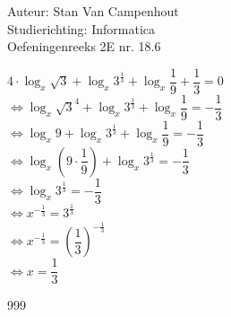 \documentclass[a4paper]{article}
\begin{document}
  
\noindent \large Auteur: Stan Van Campenhout \\
\noindent \large Studierichting:  Informatica\\
\noindent \large Oefeningenreeks 2E nr. 18.6\\

\medskip

\normalsize

$ 4 \cdot \log_{x}\sqrt3 + \log_{x}3^{\tfrac{1}{3}} + \log_{x}\dfrac{1}{9} + \dfrac{1}{3} = 0 $\\

$ \Leftrightarrow \log_{x}\sqrt3^4 +  \log_{x}3^{\tfrac{1}{3}} + \log_{x}\dfrac{1}{9} = -\dfrac{1}{3} $\\

$ \Leftrightarrow \log_{x}9 +  \log_{x}3^{\tfrac{1}{3}} + \log_{x}\dfrac{1}{9} = -\dfrac{1}{3} $\\

$ \Leftrightarrow \log_{x}\left(9 \cdot \dfrac{1}{9}\right) +  \log_{x}3^{\tfrac{1}{3}} = -\dfrac{1}{3} $\\

$ \Leftrightarrow \log_{x}3^{\tfrac{1}{3}} = -\dfrac{1}{3} $\\

$ \Leftrightarrow x^{-\tfrac{1}{3}} = 3^{\tfrac{1}{3}} $\\

$ \Leftrightarrow x^{-\tfrac{1}{3}} = \left(\dfrac{1}{3}\right)^{-\tfrac{1}{3}} $\\

$ \Leftrightarrow x = \dfrac{1}{3} $\\

\begin{thebibliography}{999}
\end{thebibliography}
\end{document}
